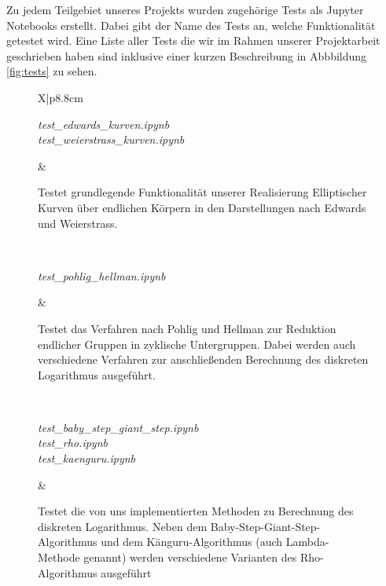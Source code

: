 \documentclass{scrartcl}
\begin{document}
Zu jedem Teilgebiet unseres Projekts wurden zugehörige Tests als Jupyter Notebooks erstellt. Dabei gibt der Name des Tests an, welche Funktionalität getestet wird. Eine Liste aller Tests die wir im Rahmen unserer Projektarbeit geschrieben haben sind inklusive einer kurzen Beschreibung in Abbbildung \ref{fig:tests} zu sehen.
\begin{figure}[h]
	\centering
 	\renewcommand{\arraystretch}{1.5}
 	\begin{tabularx}{\linewidth}{X|p{8.8cm}}
		\begin{minipage}{\linewidth}
   			\emph{test\_edwards\_kurven.ipynb} \\
   			\emph{test\_weierstrass\_kurven.ipynb}
		\end{minipage} &
 		\begin{minipage}{\linewidth}
  			  \vspace{2pt} Testet grundlegende Funktionalität unserer Realisierung Elliptischer Kurven über endlichen Körpern in den Darstellungen nach Edwards und Weierstrass. \vspace{2pt}
 		\end{minipage} \\
 		\hline
		\begin{minipage}{\linewidth}
  			\emph{test\_pohlig\_hellman.ipynb}
		\end{minipage} &
		\begin{minipage}{\linewidth}
		 	  \vspace{2pt} Testet das Verfahren nach Pohlig und Hellman zur Reduktion endlicher Gruppen in zyklische Untergruppen. 
  			Dabei werden auch verschiedene Verfahren zur anschließenden Berechnung  des diskreten Logarithmus ausgeführt.   \vspace{2pt}
		\end{minipage} \\
		\hline
  		\begin{minipage}{\linewidth}
			\emph{test\_baby\_step\_giant\_step.ipynb} \\
			\emph{test\_rho.ipynb}  \\
			\emph{test\_kaenguru.ipynb} 
		\end{minipage} &
		\begin{minipage}{\linewidth}
			\vspace{2pt} Testet die von uns implementierten Methoden zu Berechnung des diskreten Logarithmus. Neben dem Baby-Step-Giant-Step-Algorithmus und dem Känguru-Algorithmus (auch Lambda-Methode genannt) 
			werden verschiedene Varianten des Rho-Algorithmus ausgeführt  \vspace{2pt}

\end{minipage}
\end{tabularx}
\end{figure}
\end{document}
